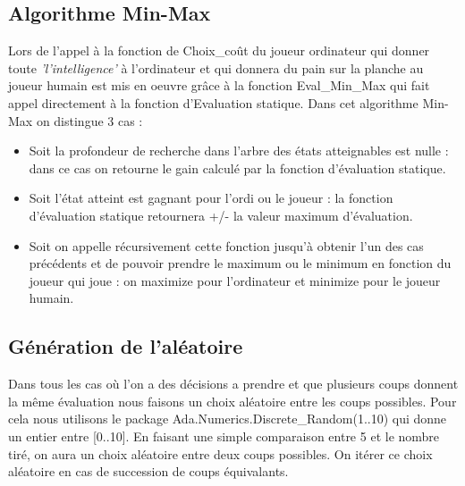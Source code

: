 \documentclass[a4paper, 10pt, french]{article}
\begin{document}
{    \subsection{Algorithme Min-Max}
    {
    Lors de l'appel à la fonction de Choix\_coût du joueur ordinateur qui donner toute {\em 'l'intelligence'} à l'ordinateur et qui donnera du pain sur la planche au joueur humain est mis en oeuvre grâce à la fonction Eval\_Min\_Max qui fait appel directement à la fonction d'Evaluation statique.
    Dans cet algorithme Min-Max on distingue 3 cas :
    \begin{itemize}
            \item Soit la profondeur de recherche dans l'arbre des états atteignables est nulle : dans ce cas on retourne le gain calculé par la fonction d'évaluation statique. 
            \item Soit l'état atteint est gagnant pour l'ordi ou le joueur : la fonction d'évaluation statique retournera +/- la valeur maximum d'évaluation.
            \item Soit on appelle récursivement cette fonction jusqu'à obtenir l'un des cas précédents et de pouvoir prendre le maximum ou le minimum en fonction du joueur qui joue : on maximize pour l'ordinateur et minimize pour le joueur humain.
        \end{itemize}
    }

    \subsection{Génération de l'aléatoire}
    {
    Dans tous les cas où l'on a des décisions a prendre et que plusieurs coups donnent la même évaluation nous faisons un choix aléatoire entre les coups possibles.
    Pour cela nous utilisons le package Ada.Numerics.Discrete\_Random(1..10) qui donne un entier entre [0..10]. En faisant une simple comparaison entre 5 et le nombre tiré, on aura un choix aléatoire entre deux coups possibles. On itérer ce choix aléatoire en cas de succession de coups équivalants. 
    }
}   
\end{document}
